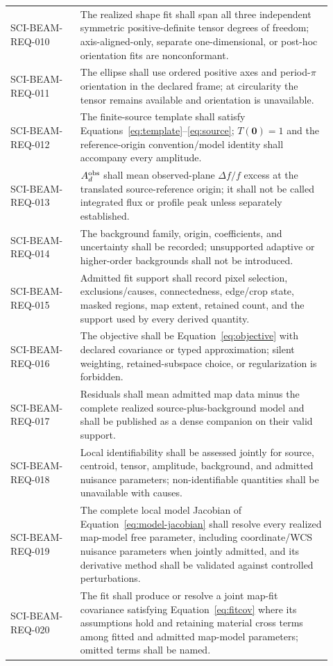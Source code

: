 \begin{longtable}{>{\raggedright\arraybackslash\ttfamily\scriptsize}p{0.20\linewidth}L{0.72\linewidth}}
SCI-BEAM-REQ-010 & The realized shape fit shall span all three independent symmetric positive-definite tensor degrees of freedom; axis-aligned-only, separate one-dimensional, or post-hoc orientation fits are nonconformant. \\
SCI-BEAM-REQ-011 & The ellipse shall use ordered positive axes and period-$\pi$ orientation in the declared frame; at circularity the tensor remains available and orientation is unavailable. \\
SCI-BEAM-REQ-012 & The finite-source template shall satisfy Equations~\ref{eq:template}--\ref{eq:source}; $T(\mathbf0)=1$ and the reference-origin convention/model identity shall accompany every amplitude. \\
SCI-BEAM-REQ-013 & $A_d^{\rm obs}$ shall mean observed-plane $\Delta f/f$ excess at the translated source-reference origin; it shall not be called integrated flux or profile peak unless separately established. \\
SCI-BEAM-REQ-014 & The background family, origin, coefficients, and uncertainty shall be recorded; unsupported adaptive or higher-order backgrounds shall not be introduced. \\
SCI-BEAM-REQ-015 & Admitted fit support shall record pixel selection, exclusions/causes, connectedness, edge/crop state, masked regions, map extent, retained count, and the support used by every derived quantity. \\
SCI-BEAM-REQ-016 & The objective shall be Equation~\ref{eq:objective} with declared covariance or typed approximation; silent weighting, retained-subspace choice, or regularization is forbidden. \\
SCI-BEAM-REQ-017 & Residuals shall mean admitted map data minus the complete realized source-plus-background model and shall be published as a dense companion on their valid support. \\
SCI-BEAM-REQ-018 & Local identifiability shall be assessed jointly for source, centroid, tensor, amplitude, background, and admitted nuisance parameters; non-identifiable quantities shall be unavailable with causes. \\
SCI-BEAM-REQ-019 & The complete local model Jacobian of Equation~\ref{eq:model-jacobian} shall resolve every realized map-model free parameter, including coordinate/WCS nuisance parameters when jointly admitted, and its derivative method shall be validated against controlled perturbations. \\
SCI-BEAM-REQ-020 & The fit shall produce or resolve a joint map-fit covariance satisfying Equation~\ref{eq:fitcov} where its assumptions hold and retaining material cross terms among fitted and admitted map-model parameters; omitted terms shall be named. \\

\end{longtable}
